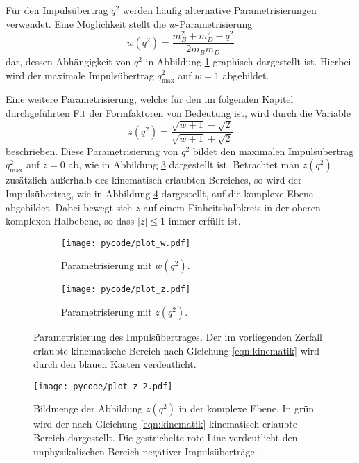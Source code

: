 Für den Impulsübertrag $q^2$ werden häufig alternative Parametrisierungen verwendet.
Eine Möglichkeit stellt die $w$-Parametrisierung
\begin{equation}
  w(q^2) = \frac{m_B^2 + m_D^2 - q^2}{2 m_B m_D}
\end{equation}
dar, dessen Abhängigkeit von $q^2$ in Abbildung \ref{fig:w_param} graphisch dargestellt ist.
Hierbei wird der maximale Impulsübertrag $q_\text{max}^2$ auf $w=1$ abgebildet.

Eine weitere Parametrisierung, welche für den im folgenden Kapitel durchgeführten Fit der Formfaktoren von Bedeutung ist, wird durch die Variable
\begin{equation}
  z(q^2) = \frac{\sqrt{w+1}-\sqrt{2}}{\sqrt{w+1}+\sqrt{2}}
\end{equation}
beschrieben.
Diese Parametrisierung von $q^2$ bildet den maximalen Impulsübertrag $q_\text{max}^2$ auf $z=0$ ab, wie in Abbildung \ref{fig:z_param} dargestellt ist.
Betrachtet man $z(q^2)$ zusätzlich außerhalb des kinematisch erlaubten Bereiches, so wird der Impulsübertrag, wie in Abbildung \ref{fig:z_kreis} dargestellt, auf die komplexe Ebene abgebildet.
Dabei bewegt sich $z$ auf einem Einheitshalbkreis in der oberen komplexen Halbebene, so dass $\lvert z \rvert \leq \num{1}$ immer erfüllt ist.

\begin{figure}
  \centering
  \begin{subfigure}{0.48\textwidth}
    \centering
    \texttt{[image: pycode/plot\_w.pdf]}
    \caption{Parametrisierung mit $w(q^2)$.}
    \label{fig:w_param}
  \end{subfigure}
  \begin{subfigure}{0.48\textwidth}
    \centering
    \texttt{[image: pycode/plot\_z.pdf]}
    \caption{Parametrisierung mit $z(q^2)$.}
    \label{fig:z_param}
  \end{subfigure}
  \caption{Parametrisierung des Impulsübertrages. Der im vorliegenden Zerfall erlaubte kinematische Bereich nach Gleichung \eqref{eqn:kinematik} wird durch den blauen Kasten verdeutlicht.}
\end{figure}

\begin{figure}
  \centering
  \texttt{[image: pycode/plot\_z\_2.pdf]}
  \caption{Bildmenge der Abbildung $z(q^2)$ in der komplexe Ebene. In grün wird der nach Gleichung \eqref{eqn:kinematik} kinematisch erlaubte Bereich dargestellt. Die gestrichelte rote Line verdeutlicht den unphysikalischen Bereich negativer Impulsüberträge.}
  \label{fig:z_kreis}
\end{figure}
